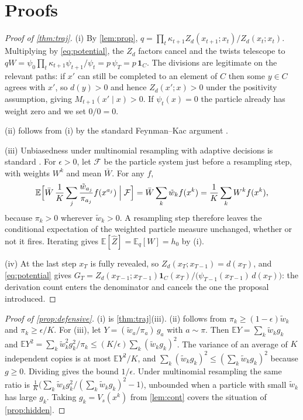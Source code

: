 \documentclass[11pt]{article}
\theoremstyle{definition}
\newcommand{\one}{\mathbf{1}}
\newcommand{\E}{\mathbb{E}}
\newcommand{\Zh}{\widehat Z}
\newcommand{\wt}{\tilde w}
\begin{document}
\appendix
\section{Proofs}\label{app:proofs}

\begin{proof}[Proof of \cref{thm:traj}]
(i) By \cref{lem:prop}, $q=\prod_t\kappa_{t+1}Z_d(x_{t+1};x_t)/Z_d(x_t;x_t)$. Multiplying by
\eqref{eq:potential}, the $Z_d$ factors cancel and the twists telescope to
$qW=\psi_0\prod_t\kappa_{t+1}\psi_{t+1}/\psi_t=p\,\psi_T=p\,\one_C$. The divisions are legitimate on the relevant
paths: if $x'$ can still be completed to an element of $C$ then some $y\in C$ agrees with $x'$, so $d(y)>0$ and
hence $Z_d(x';x)>0$ under the positivity assumption, giving $M_{t+1}(x'\mid x)>0$. If $\psi_t(x)=0$ the particle
already has weight zero and we set $0/0=0$.

(ii) follows from (i) by the standard Feynman--Kac argument \cite{delmoral2004}.

(iii) Unbiasedness under multinomial resampling with adaptive decisions is standard \cite{delmoral2004}. For
$\epsilon>0$, let $\mathcal F$ be the particle system just before a resampling step, with weights $W^k$ and mean
$\bar W$. For any $f$,
\[
  \E\Big[\bar W\,\frac1K\sum_j\frac{\wt_{a_j}}{\pi_{a_j}}f(x^{a_j})\Bigm|\mathcal F\Big]
  =\bar W\sum_k\wt_kf(x^k)=\frac1K\sum_kW^kf(x^k),
\]
because $\pi_k>0$ wherever $\wt_k>0$. A resampling step therefore leaves the conditional expectation of the
weighted particle measure unchanged, whether or not it fires. Iterating gives $\E[\Zh]=\E_q[W]=h_0$ by (i).

(iv) At the last step $x_T$ is fully revealed, so $Z_d(x_T;x_{T-1})=d(x_T)$, and \eqref{eq:potential} gives
$G_T=Z_d(x_{T-1};x_{T-1})\one_C(x_T)/\big(\psi_{T-1}(x_{T-1})\,d(x_T)\big)$: the derivation count enters the
denominator and cancels the one the proposal introduced.
\end{proof}

\begin{proof}[Proof of \cref{prop:defensive}]
(i) is \cref{thm:traj}(iii). (ii) follows from $\pi_k\ge(1-\epsilon)\wt_k$ and $\pi_k\ge\epsilon/K$. For (iii),
let $Y=(\wt_a/\pi_a)\,g_a$ with $a\sim\pi$. Then $\E Y=\sum_k\wt_kg_k$ and
$\E Y^2=\sum_k\wt_k^2g_k^2/\pi_k\le(K/\epsilon)\sum_k(\wt_kg_k)^2$. The variance of an average of $K$ independent
copies is at most $\E Y^2/K$, and $\sum_k(\wt_kg_k)^2\le(\sum_k\wt_kg_k)^2$ because $g\ge0$. Dividing gives the
bound $1/\epsilon$. Under multinomial resampling the same ratio is
$\frac1K\big(\sum_k\wt_kg_k^2/(\sum_k\wt_kg_k)^2-1\big)$, unbounded when a particle with small $\wt_k$ has large
$g_k$. Taking $g_k=V_s(x^k)$ from \cref{lem:cont} covers the situation of \cref{prop:hidden}.
\end{proof}
\end{document}
